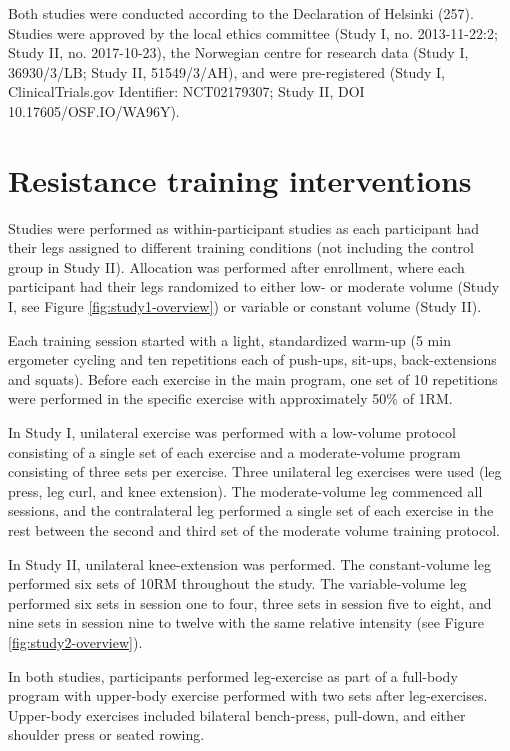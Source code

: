 \documentclass[twoside,10pt]{gihclass} %
\begin{document}
Both studies were conducted according to the Declaration of Helsinki
(257).
Studies were approved by the local ethics committee (Study I, no. 2013-11-22:2; Study II, no. 2017-10-23), the Norwegian centre for research data (Study I, 36930/3/LB; Study II, 51549/3/AH), and were pre-registered (Study I, ClinicalTrials.gov Identifier: NCT02179307; Study II, DOI 10.17605/OSF.IO/WA96Y).

\hypertarget{resistance-training-interventions}{%
\section{Resistance training interventions}\label{resistance-training-interventions}}

Studies were performed as within-participant studies
as each participant had their legs assigned to different training
conditions (not including the control group in Study II). Allocation was
performed after enrollment, where each participant had their legs
randomized to either low- or moderate volume (Study I, see Figure \ref{fig:study1-overview}) or variable or constant volume (Study II).

Each training session started with a light, standardized warm-up (5 min
ergometer cycling and ten repetitions each of push-ups, sit-ups,
back-extensions and squats). Before each exercise in the main program,
one set of 10 repetitions were performed in the specific exercise with
approximately 50\% of 1RM.

In Study I, unilateral exercise was performed with a low-volume protocol consisting of a single set of each exercise and a moderate-volume program consisting of three sets per exercise.
Three unilateral leg exercises were used (leg press, leg curl, and knee
extension). The moderate-volume leg commenced all sessions, and the contralateral leg performed a single set of each exercise in the rest between the second and third set of the moderate volume training protocol.

In Study II, unilateral knee-extension was performed. The constant-volume leg performed six sets of 10RM throughout the study. The variable-volume leg performed six sets in session one to four, three sets in session five to eight, and nine sets in session nine to twelve with the same relative intensity (see Figure \ref{fig:study2-overview}).

In both studies, participants performed leg-exercise as part of a full-body program with upper-body exercise performed with two sets after leg-exercises. Upper-body exercises included bilateral bench-press, pull-down, and either shoulder press or seated rowing.
\end{document}

